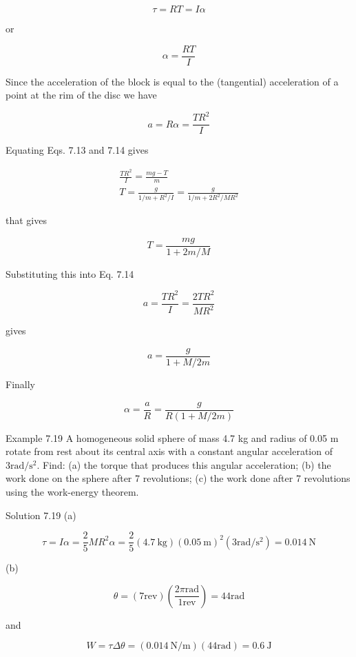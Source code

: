 \documentclass[10pt]{article}
\begin{document}
$$
\tau=R T=I \alpha
$$

or

$$
\alpha=\frac{R T}{I}
$$

Since the acceleration of the block is equal to the (tangential) acceleration of a point at the rim of the disc we have


\begin{equation*}
a=R \alpha=\frac{T R^{2}}{I} \tag{7.14}
\end{equation*}


Equating Eqs. 7.13 and 7.14 gives

$$
\begin{gathered}
\frac{T R^{2}}{I}=\frac{m g-T}{m} \\
T=\frac{g}{1 / m+R^{2} / I}=\frac{g}{1 / m+2 R^{2} / M R^{2}}
\end{gathered}
$$

that gives

$$
T=\frac{m g}{1+2 m / M}
$$

Substituting this into Eq. 7.14

$$
a=\frac{T R^{2}}{I}=\frac{2 T R^{2}}{M R^{2}}
$$

gives

$$
a=\frac{g}{1+M / 2 m}
$$

Finally

$$
\alpha=\frac{a}{R}=\frac{g}{R(1+M / 2 m)}
$$

Example 7.19 A homogeneous solid sphere of mass 4.7 kg and radius of 0.05 m rotate from rest about its central axis with a constant angular acceleration of $3 \mathrm{rad} / \mathrm{s}^{2}$. Find: (a) the torque that produces this angular acceleration; (b) the work done on the sphere after 7 revolutions; (c) the work done after 7 revolutions using the work-energy theorem.

Solution 7.19 (a)

$$
\tau=I \alpha=\frac{2}{5} M R^{2} \alpha=\frac{2}{5}(4.7 \mathrm{~kg})(0.05 \mathrm{~m})^{2}\left(3 \mathrm{rad} / \mathrm{s}^{2}\right)=0.014 \mathrm{~N}
$$

(b)

$$
\theta=(7 \mathrm{rev})\left(\frac{2 \pi \mathrm{rad}}{1 \mathrm{rev}}\right)=44 \mathrm{rad}
$$

and

$$
W=\tau \Delta \theta=(0.014 \mathrm{~N} / \mathrm{m})(44 \mathrm{rad})=0.6 \mathrm{~J}
$$
\end{document}
